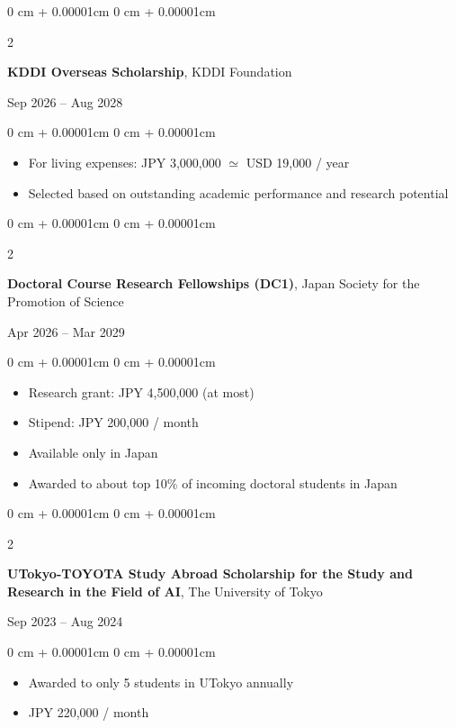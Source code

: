 \documentclass[11pt, letterpaper]{article}
\newenvironment{highlights}{
    \begin{itemize}[
        topsep=0.0cm,
        parsep=0.0cm,
        partopsep=0pt,
        itemsep=0pt,
        leftmargin=10pt
    ]
}{
    \end{itemize}
} %
\newenvironment{onecolentry}{
    \begin{adjustwidth}{
        0 cm + 0.00001cm
    }{
        0 cm + 0.00001cm
    }
}{
    \end{adjustwidth}
} %
\newenvironment{twocolentry}[2][]{
    \onecolentry
    \def\secondColumn{#2}
    \setcolumnwidth{\fill, 3.5cm}
    \begin{paracol}{2}
}{
    \switchcolumn \raggedleft \secondColumn
    \end{paracol}
    \endonecolentry
} %
\begin{document}
      \vspace{0.30cm}
      \begin{samepage}
        \begin{twocolentry}{Sep 2026 -- Aug 2028}
          \textbf{KDDI Overseas Scholarship}, KDDI Foundation
        \end{twocolentry}
        \vspace{0.05 cm}
        \begin{onecolentry}
          \begin{highlights}
            \item For living expenses: JPY 3,000,000 \(\simeq\) USD 19,000 / year
            \item Selected based on outstanding academic performance and research potential
          \end{highlights}
        \end{onecolentry}
      \end{samepage}
      \vspace{0.30cm}
      \begin{samepage}
        \begin{twocolentry}{Apr 2026 -- Mar 2029}
          \textbf{Doctoral Course Research Fellowships (DC1)}, Japan Society for the Promotion of Science
        \end{twocolentry}
        \vspace{0.05 cm}
        \begin{onecolentry}
          \begin{highlights}
            \item Research grant: JPY 4,500,000 (at most)
            \item Stipend: JPY 200,000 / month
            \item Available only in Japan
            \item Awarded to about top 10\% of incoming doctoral students in Japan
          \end{highlights}
        \end{onecolentry}
      \end{samepage}
      \vspace{0.30cm}
      \begin{samepage}
        \begin{twocolentry}{Sep 2023 -- Aug 2024}
          \textbf{UTokyo-TOYOTA Study Abroad Scholarship for the Study and Research in the Field of AI}, The University of Tokyo
        \end{twocolentry}
        \vspace{0.05 cm}
        \begin{onecolentry}
          \begin{highlights}
            \item Awarded to only 5 students in UTokyo annually
            \item JPY 220,000 / month
          \end{highlights}
        \end{onecolentry}
      \end{samepage}
\end{document}
